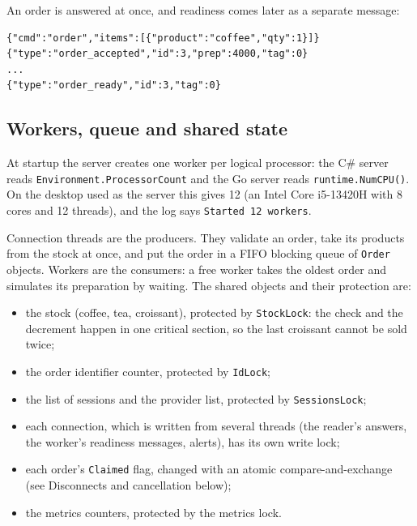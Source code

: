 \documentclass[12pt,a4paper]{article}
\begin{document}
An order is answered at once, and readiness comes later as a separate message:

\begin{lstlisting}[style=plain,caption={An order is accepted at once; readiness arrives later.}]
{"cmd":"order","items":[{"product":"coffee","qty":1}]}
{"type":"order_accepted","id":3,"prep":4000,"tag":0}
...
{"type":"order_ready","id":3,"tag":0}
\end{lstlisting}

\subsection{Workers, queue and shared state}

At startup the server creates one worker per logical processor: the C\# server
reads \texttt{Environment.ProcessorCount} and the Go server reads
\texttt{runtime.NumCPU()}. On the desktop used as the server this gives 12 (an
Intel Core i5-13420H with 8 cores and 12 threads), and the log says
\texttt{Started 12 workers}.

Connection threads are the producers. They validate an order, take its products
from the stock at once, and put the order in a FIFO blocking queue of
\texttt{Order} objects. Workers are the consumers: a free worker takes the oldest
order and simulates its preparation by waiting. The shared objects and their
protection are:

\begin{itemize}[itemsep=2pt]
    \item the stock (coffee, tea, croissant), protected by \texttt{StockLock}: the
          check and the decrement happen in one critical section, so the last
          croissant cannot be sold twice;
    \item the order identifier counter, protected by \texttt{IdLock};
    \item the list of sessions and the provider list, protected by \texttt{SessionsLock};
    \item each connection, which is written from several threads (the reader's
          answers, the worker's readiness messages, alerts), has its own write lock;
    \item each order's \texttt{Claimed} flag, changed with an atomic
          compare-and-exchange (see Disconnects and cancellation below);
    \item the metrics counters, protected by the metrics lock.
\end{itemize}
\end{document}
